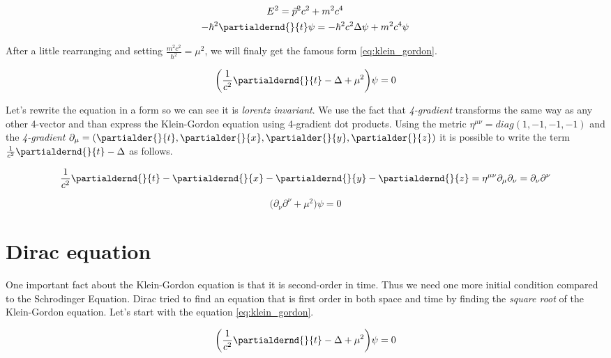 \begin{equation*}
    \begin{gathered}
        E^{2} = \vec{p}^{2} c^{2} + m^{2} c^{4} \\
        - \hbar^{2} \partialdernd{}{t} \psi = - \hbar^{2} c^{2} \Delta \psi + m^{2} c^{4} \psi
    \end{gathered}
\end{equation*}

After a little rearranging and setting $\frac{m^{2} c^{2}}{\hbar^{2}} = \mu^{2}$, we will finaly get the famous form \ref{eq:klein_gordon}.

\begin{equation}
    \label{eq:klein_gordon}
    \bigg(\frac{1}{c^{2}} \partialdernd{}{t} - \Delta + \mu^{2} \bigg) \psi = 0
\end{equation}

Let's rewrite the equation in a form so we can see it is \textit{lorentz invariant}. We use the fact that \textit{4-gradient}
transforms the same way as any other 4-vector and than express the Klein-Gordon equation using 4-gradient dot products.
Using the metric $\eta^{\mu \nu} = diag(1, -1, -1, -1)$ and the \textit{4-gradient} $\partial_{\mu} = (\partialder{}{t}, \partialder{}{x}, \partialder{}{y}, \partialder{}{z})$ 
it is possible to write the term $\frac{1}{c^{2}} \partialdernd{}{t} - \Delta$ as follows.

\begin{equation*}
     \frac{1}{c^{2}} \partialdernd{}{t} - \partialdernd{}{x} - \partialdernd{}{y} - \partialdernd{}{z} = \eta^{\mu \nu} \partial_{\mu} \partial_{\nu} = \partial_{\nu} \partial^{\nu}
\end{equation*}

\begin{equation}
    \bigg(\partial_{\nu} \partial^{\nu} + \mu^{2} \bigg) \psi = 0
\end{equation}

\section{Dirac equation}

\paragraph{} One important fact about the Klein-Gordon equation is that it is second-order in time. Thus we need
one more initial condition compared to the Schrodinger Equation. Dirac tried to find an equation that is first order
in both space and time by finding the \textit{square root} of the Klein-Gordon equation. Let's start with the equation 
\ref{eq:klein_gordon}.

\begin{equation*}
    \bigg(\frac{1}{c^{2}} \partialdernd{}{t} - \Delta + \mu^{2} \bigg) \psi = 0
\end{equation*}
